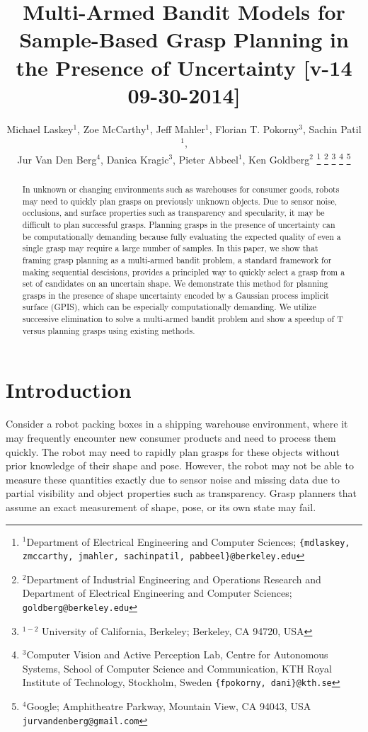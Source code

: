 \documentclass[letterpaper, 10 pt, conference]{ieeeconf}  %
\title{\LARGE \bf
Multi-Armed Bandit Models for Sample-Based Grasp Planning in the Presence of Uncertainty [v-14 09-30-2014]}
\author{Michael Laskey$^1$, Zoe McCarthy$^1$, Jeff Mahler$^1$, Florian T. Pokorny$^3$, Sachin Patil$^1$,\\ Jur Van Den Berg$^4$,  Danica Kragic$^3$, Pieter Abbeel$^1$, Ken Goldberg$^2$%
\thanks{$^1$Department of Electrical Engineering and Computer Sciences; {\tt\small \{mdlaskey, zmccarthy, jmahler, sachinpatil, pabbeel\}@berkeley.edu}}%
\thanks{$^2$Department of Industrial Engineering and Operations Research and Department of Electrical Engineering and Computer Sciences; {\tt\small goldberg@berkeley.edu}}%
\thanks{$^{1-2}$ University of California, Berkeley;  Berkeley, CA 94720, USA}%
\thanks{$^3$Computer Vision and Active Perception Lab, Centre for Autonomous Systems, School of Computer Science and Communication, KTH Royal Institute of Technology, Stockholm, Sweden {\tt\small \{fpokorny, dani\}@kth.se}}%
\thanks{$^4$Google; Amphitheatre Parkway, Mountain View, CA 94043, USA {\tt\small jurvandenberg@gmail.com}}%
}
\begin{document}
\maketitle
\thispagestyle{empty}
\pagestyle{empty}




\begin{abstract}
In unknown or changing environments such as warehouses for consumer goods, robots may need to quickly plan grasps on previously unknown objects.
Due to sensor noise, occlusions, and surface properties such as transparency and specularity, it may be difficult to plan successful grasps.
Planning grasps in the presence of uncertainty can be computationally demanding because fully evaluating the expected quality of even a single grasp may require a large number of samples.
In this paper, we show that framing grasp planning as a multi-armed bandit problem, a standard framework for making sequential descisions, provides a principled way to quickly select a grasp from a set of candidates on an uncertain shape.
We demonstrate this method for planning grasps in the presence of shape uncertainty encoded by a Gaussian process implicit surface (GPIS), which can be especially computationally demanding.
We utilize successive elimination to solve a multi-armed bandit problem and show a speedup of T versus planning grasps using existing methods.
\end{abstract}


\section{Introduction}



Consider a robot packing boxes in a shipping warehouse environment, where it may frequently encounter new consumer products and need to process them quickly.
The robot may need to rapidly plan grasps for these objects without prior knowledge of their shape and pose.
However, the robot may not be able to measure these quantities exactly due to sensor noise and missing data due to partial visibility and object properties such as transparency.
Grasp planners that assume an exact measurement of shape, pose, or its own state may fail.
\end{document}
